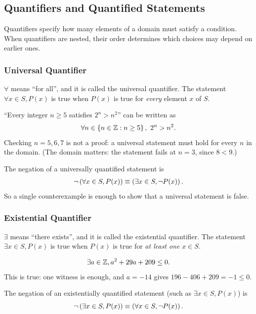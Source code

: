 \subsection{Quantifiers and Quantified Statements}
Quantifiers specify how many elements of a domain must satisfy a condition.
When quantifiers are nested, their order determines which choices may
depend on earlier ones.
\subsubsection{Universal Quantifier}
$\forall$ means ``for all'', and it is called the universal quantifier.
The statement $\forall x \in S, P(x)$ is true when $P(x)$ is true for \emph{every} element $x$ of $S$.

\begin{example}
    ``Every integer $n \geq 5$ satisfies $2^n > n^2$'' can be written as
    \begin{equation*}
        \forall n \in \left\{n \in \mathbb{Z} : n \geq 5\right\},\ 2^n > n^2.
    \end{equation*}
    Checking $n = 5, 6, 7$ is not a proof: a universal statement must hold for every $n$ in the domain.
    (The domain matters: the statement fails at $n = 3$, since $8 < 9$.)
\end{example}

The negation of a universally quantified statement is
\begin{align*}
    \neg \left(\forall x \in S, P(x)\right) \equiv \left(\exists x \in S, \neg P(x)\right).
\end{align*}
So a single counterexample is enough to show that a universal statement is false.

\subsubsection{Existential Quantifier}
$\exists$ means ``there exists'', and it is called the existential quantifier.
The statement $\exists x \in S, P(x)$ is true when $P(x)$ is true for \emph{at least one} $x \in S$.
\begin{example}
    \begin{align*}
        \exists a \in \mathbb{Z}, a^2 + 29a + 209 \leq 0.
    \end{align*}
    This is true: one witness is enough, and $a = -14$ gives $196 - 406 + 209 = -1 \leq 0$.
\end{example}

The negation of an existentially quantified statement (such as $\exists x \in S, P(x)$) is
\begin{equation*}
    \neg \left(\exists x \in S, P(x)\right) \equiv \left(\forall x \in S, \neg P(x)\right).
\end{equation*}

